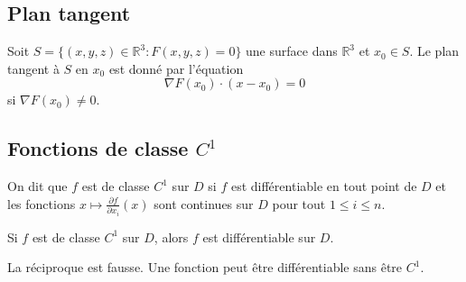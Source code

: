 \documentclass[oneside]{book}
\begin{document}
\subsection{Plan tangent}
Soit $S = \{(x, y, z) \in \mathbb{R}^3 : F(x, y, z) = 0\}$ une surface dans $\mathbb{R}^3$ et $x_0 \in S$.
Le plan tangent à $S$ en $x_0$ est donné par l'équation
\[
\nabla F(x_0) \cdot (x - x_0) = 0
\]
si $\nabla F(x_0) \neq 0$.

\subsection{Fonctions de classe $C^1$}
\begin{definition}
On dit que $f$ est de classe $C^1$ sur $D$ si $f$ est différentiable en tout point de $D$ et les fonctions $x \mapsto \frac{\partial f}{\partial x_i}(x)$ sont continues sur $D$ pour tout $1 \leq i \leq n$.
\end{definition}

\begin{theorem}
Si $f$ est de classe $C^1$ sur $D$, alors $f$ est différentiable sur $D$.
\end{theorem}

\begin{remark}
La réciproque est fausse. Une fonction peut être différentiable sans être $C^1$.
\end{remark}
\end{document}
